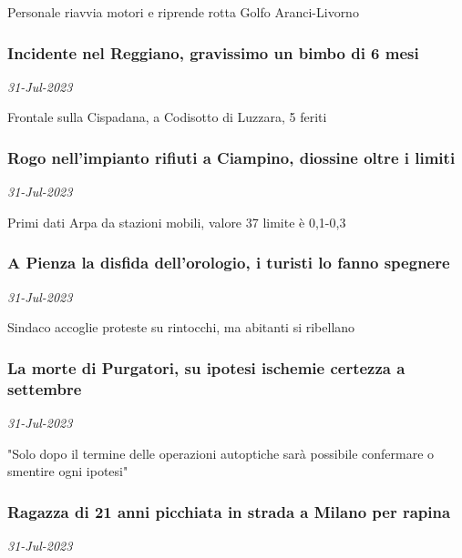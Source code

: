 Personale riavvia motori e riprende rotta Golfo Aranci-Livorno
\subsubsection{Incidente nel Reggiano, gravissimo un bimbo di 6 mesi \href{https://www.ansa.it/sito/notizie/cronaca/2023/07/31/incidente-nel-reggiano-gravissimo-un-bimbo-di-6-mesi_9741187a-52c5-41e6-998c-3b92ccb18f8f.html}{}}
\textit{31-Jul-2023}

Frontale sulla Cispadana, a Codisotto di Luzzara, 5 feriti
\subsubsection{Rogo nell'impianto rifiuti a Ciampino, diossine oltre i limiti \href{https://www.ansa.it/sito/notizie/cronaca/2023/07/31/rogo-nellimpianto-rifiuti-a-ciampino-diossine-oltre-i-limiti_80aa30a5-fe42-4c1e-bfb5-5b4fb4d7b7d5.html}{}}
\textit{31-Jul-2023}

Primi dati Arpa da stazioni mobili, valore 37 limite \`{e} 0,1-0,3
\subsubsection{A Pienza la disfida dell'orologio, i turisti lo fanno spegnere \href{https://www.ansa.it/sito/notizie/cronaca/2023/07/31/a-pienza-la-disfida-dellorologio-i-turisti-lo-fanno-spegnere_fee91ca4-886d-435b-a63e-d0366230052f.html}{}}
\textit{31-Jul-2023}

Sindaco accoglie proteste su rintocchi, ma abitanti si ribellano
\subsubsection{La morte di Purgatori, su ipotesi ischemie certezza a settembre \href{https://www.ansa.it/sito/notizie/cronaca/2023/07/31/la-morte-di-purgatori-su-ipotesi-ischemie-certezza-a-settembre_ae317081-e844-4247-a729-0fd5073c1685.html}{}}
\textit{31-Jul-2023}

"Solo dopo il termine delle operazioni autoptiche sar\`{a} possibile confermare o smentire ogni ipotesi"
\subsubsection{Ragazza di 21 anni picchiata in strada a Milano per rapina \href{https://www.ansa.it/sito/notizie/cronaca/2023/07/31/ragazza-di-21-anni-picchiata-in-strada-a-milano-per-rapina_b3808c9d-b454-4492-8b59-f18ae08fb896.html}{}}
\textit{31-Jul-2023}

